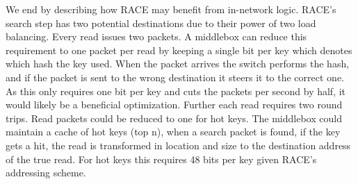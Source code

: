 We end by describing how RACE may benefit from in-network logic. RACE's search
step has two potential destinations due to their power of two load balancing.
Every read issues two packets. A middlebox can reduce this requirement to one
packet per read by keeping a single bit per key which denotes which hash the key
used. When the packet arrives the switch performs the hash, and if the packet is
sent to the wrong destination it steers it to the correct one. As this only
requires one bit per key and cuts the packets per second by half, it would
likely be a beneficial optimization. Further each read requires two round trips.
Read packets could be reduced to one for hot keys. The middlebox could maintain
a cache of hot keys (top n), when a search packet is found, if the key gets a
hit, the read is transformed in location and size to the destination address of
the true read. For hot keys this requires 48 bits per key given RACE's
addressing scheme.



